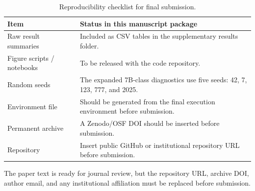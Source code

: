 \begin{table}[t]
\centering
\small
\caption{Reproducibility checklist for final submission.}
\label{tab:reproducibility}
\begin{threeparttable}

\begin{tabular}{p{}p{}}
\toprule
Item & Status in this manuscript package \\
\midrule
Raw result summaries & Included as CSV tables in the supplementary results folder. \\
Figure scripts / notebooks & To be released with the code repository. \\
Random seeds & The expanded 7B-class diagnostics use five seeds: 42, 7, 123, 777, and 2025. \\
Environment file & Should be generated from the final execution environment before submission. \\
Permanent archive & A Zenodo/OSF DOI should be inserted before submission. \\
Repository & Insert public GitHub or institutional repository URL before submission. \\
\bottomrule
\end{tabular}

\begin{tablenotes}[flushleft]\footnotesize\item \parbox{0.95\textwidth}{The paper text is ready for journal review, but the repository URL, archive DOI, author email, and any institutional affiliation must be replaced before submission.}\end{tablenotes}
\end{threeparttable}
\end{table}
